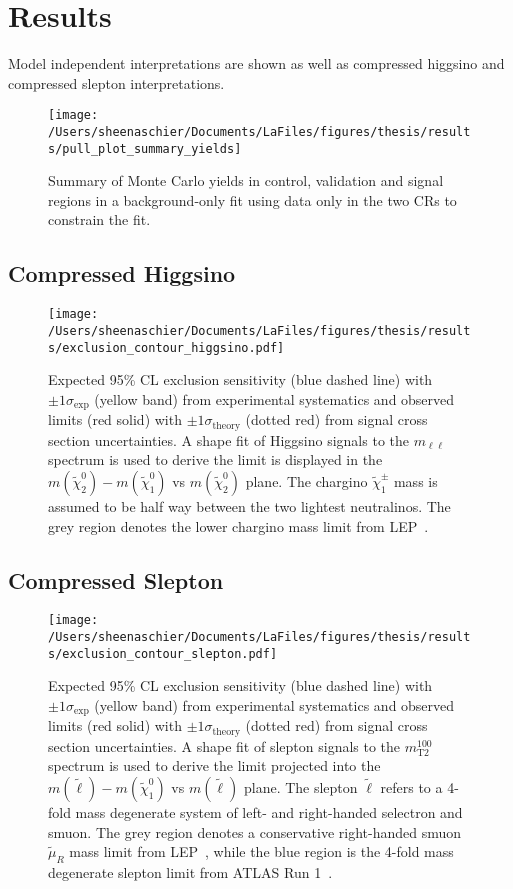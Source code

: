 \documentclass[11pt, oneside]{article}   	%
\begin{document}
\section{Results}
\label{sec:results}
Model independent interpretations are shown as well as compressed higgsino and compressed slepton interpretations.
\begin{figure}
 \centering
\texttt{[image: /Users/sheenaschier/Documents/LaFiles/figures/thesis/results/pull\_plot\_summary\_yields]}
   \caption{Summary of Monte Carlo yields in control, validation and signal regions in a background-only fit using data only in the two CRs to constrain the fit.}
  \label{fig:pull_plot_summary_yields}
 \end{figure}
\FloatBarrier

\subsection{Compressed Higgsino}
 \begin{figure}
 \centering
 \texttt{[image: /Users/sheenaschier/Documents/LaFiles/figures/thesis/results/exclusion\_contour\_higgsino.pdf]}
  \caption{
 Expected 95\% CL exclusion sensitivity (blue dashed line) with $\pm 1 \sigma_\text{exp}$ (yellow band) from experimental systematics
   and observed limits (red solid) with $\pm 1 \sigma_\text{theory}$ (dotted red) from signal cross section uncertainties.
A shape fit of Higgsino signals to the $m_{\ell\ell}$ spectrum is used to derive
 the limit is displayed in the $m(\tilde{\chi}^0_2) - m(\tilde{\chi}^0_1)$ vs $m(\tilde{\chi}^0_2)$ plane.
 The chargino $\tilde{\chi}^\pm_1$ mass is assumed to be half way between the two lightest neutralinos.
  The grey region denotes the lower chargino mass limit from LEP~\cite{LEPlimits}.}
   \label{fig:exclusion_contour_higgsino}
 \end{figure}
 \FloatBarrier
 
 \subsection{Compressed Slepton}
  \begin{figure}
 \centering
 \texttt{[image: /Users/sheenaschier/Documents/LaFiles/figures/thesis/results/exclusion\_contour\_slepton.pdf]}
  \caption{
Expected 95\% CL exclusion sensitivity (blue dashed line) with $\pm 1 \sigma_\text{exp}$ (yellow band) from experimental systematics
and observed limits (red solid) with $\pm 1 \sigma_\text{theory}$ (dotted red) from signal cross section uncertainties.
A shape fit of slepton signals to the $m_\text{T2}^{100}$ spectrum is used to derive
the limit projected into the $m(\tilde{\ell}) - m(\tilde{\chi}^0_1)$ vs $m(\tilde{\ell})$ plane.
The slepton $\tilde{\ell}$ refers to a 4-fold mass degenerate system of left- and right-handed selectron and smuon.
The grey region denotes a conservative right-handed smuon $\tilde{\mu}_R$ mass limit from LEP~\cite{LEPlimits},
while the blue region is the 4-fold mass degenerate slepton limit from ATLAS Run 1~\cite{SUSY-2013-11}.}
   \label{fig:exclusion_contour_slepton}
 \end{figure}
 
\end{document}
